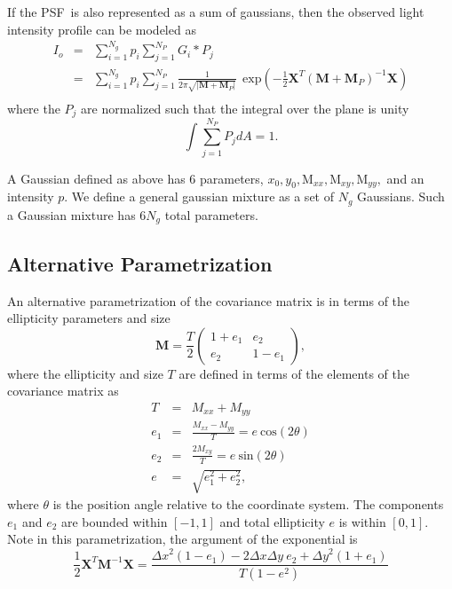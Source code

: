 \documentclass[12pt,preprint]{aastex}
\newcommand{\M}{\textbf{M}}
\newcommand{\X}{\textbf{X}}
\newcommand{\Dx}{\ensuremath{\Delta x}}
\newcommand{\Dy}{\ensuremath{\Delta y}}
\newcommand{\psf}{PSF}
\begin{document}
If the \psf\ is also represented as a sum of gaussians, then the observed
light intensity profile can be modeled as
\begin{eqnarray} \label{eq:postpsf}
I_o & = & \sum_{i=1}^{N_{g}} p_i \sum_{j=1}^{N_{P}} G_i * P_j \\
    & = & \sum_{i=1}^{N_{g}} p_i \sum_{j=1}^{N_{P}} \frac{1}{2 \pi \sqrt{|\M + \M_P|} } ~~ \textrm{exp}\left( -\frac{1}{2} \X^T (\M+\M_P)^{-1} \X \right) \\
\end{eqnarray}
where the $P_j$ are normalized such that the integral over
the plane is unity
\begin{equation}
\int \sum_{j=1}^{N_{P}} P_j dA = 1.
\end{equation}

A Gaussian defined as above has 6 parameters, $x_0, y_0, \textrm{M}_{xx},
\textrm{M}_{xy}, \textrm{M}_{yy},$ and an intensity $p$.  We define a general gaussian
mixture as a set of $N_g$ Gaussians.  Such a Gaussian 
mixture has $6 N_g$ total parameters.

\subsection{Alternative Parametrization}

An alternative parametrization of the covariance matrix is in
terms of the ellipticity parameters and size
\begin{equation}
\M = \frac{T}{2}\left( \begin{array}{cc}
1+e_1 & e_2 \\
e_2 & 1-e_1 \end{array} \right),
\end{equation}
where the ellipticity and size $T$ are defined in terms
of the elements of the covariance matrix as
\begin{eqnarray}
T & = & M_{xx} + M_{yy} \\
e_1 & = & \frac{M_{xx}-M_{yy}}{T}  = e ~ \textrm{cos} (2 \theta) \\
e_2 & = & \frac{2 M_{xy}}{T}  = e ~ \textrm{sin} (2 \theta) \\
e & = & \sqrt{e_1^2 + e_2^2},
\end{eqnarray}
where $\theta$ is the position angle relative to the coordinate system. 
The components 
$e_1$ and $e_2$ are bounded within
$[-1,1]$ and total ellipticity $e$ is within $[0,1]$.  Note in this
parametrization, the argument of the exponential is
\begin{equation}
\frac{1}{2} \X^T \M^{-1} \X = \frac{\Dx^2 (1-e_1) - 2 \Dx \Dy~e_2 + \Dy^2 (1+e_1)}{T (1-e^2)}
\end{equation}
\end{document}

